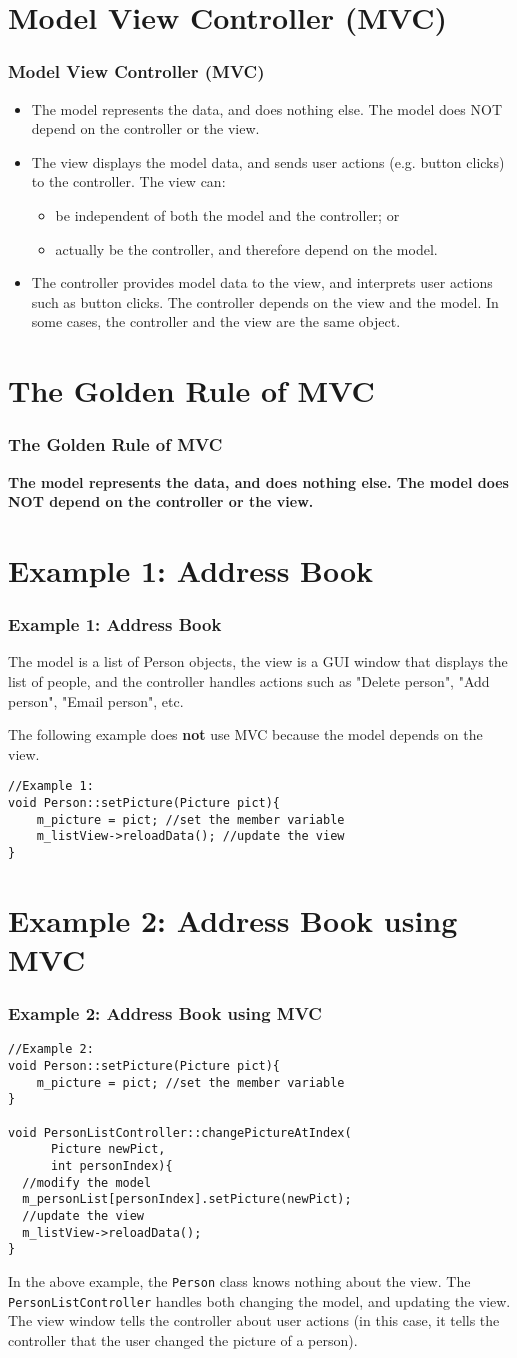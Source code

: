 \documentclass{beamer}
\newcommand{\bi}{\begin{itemize}}
\newcommand{\ii}{\item}
\newcommand{\ei}{\end{itemize}}
\newcommand{\sect}[1]{
\section{#1}
\begin{frame}[fragile]\frametitle{#1}
}
\begin{document}
\sect{Model View Controller (MVC)}
\bi
\ii
The model represents the data, and does nothing else. The model does
NOT depend on the controller or the view. 
\ii
The view displays the model data, and sends user actions (e.g. button
clicks) to the controller. The view can: 
\bi
\ii
be independent of both the model and the controller; or
\ii
actually be the controller, and therefore depend on the model.
\ei
\ii
The controller provides model data to the view, and interprets user actions such as button clicks. The controller depends on the view and the model. In some cases, the controller and the view are the same object.



\ei
\end{frame}

\sect{The Golden Rule of MVC}

{\LARGE\bf
  The model represents the data, and does nothing else.
  The model does
  NOT depend on the controller or the view.
}

\end{frame}

\sect{Example 1: Address Book}

The model is a list of Person objects, the view is a GUI window that
displays the list of people, and the controller handles actions such
as "Delete person", "Add person", "Email person", etc.

The following
example does {\bf not} use MVC because the model depends on the view.

\begin{Verbatim}[frame=single]
//Example 1:
void Person::setPicture(Picture pict){
    m_picture = pict; //set the member variable
    m_listView->reloadData(); //update the view
}
\end{Verbatim}

\end{frame}

\sect{Example 2: Address Book using MVC}


\begin{Verbatim}[frame=single]
//Example 2:
void Person::setPicture(Picture pict){
    m_picture = pict; //set the member variable
}

void PersonListController::changePictureAtIndex(
      Picture newPict, 
      int personIndex){
  //modify the model
  m_personList[personIndex].setPicture(newPict);
  //update the view
  m_listView->reloadData();
}
\end{Verbatim}
In the above example, the {\tt Person} class knows nothing about the
view. The {\tt PersonListController} handles both changing the model, and
updating the view. The view window tells the controller about user
actions (in this case, it tells the controller that the user changed
the picture of a person).
\end{frame}
\end{document}
